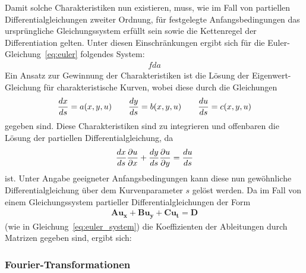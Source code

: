 Damit solche Charakteristiken nun existieren, muss, wie im Fall von partiellen Differentialgleichungen zweiter Ordnung, für festgelegte Anfangsbedingungen das ursprüngliche Gleichungssystem erfüllt sein sowie die Kettenregel der Differentiation gelten. Unter diesen Einschränkungen ergibt sich für die Euler-Gleichung~\eqref{eq:euler} folgendes System:
\begin{align*}
    fda
\end{align*}
Ein Ansatz zur Gewinnung der Charakteristiken ist die Lösung der Eigenwert-Gleichung für charakteristische Kurven, wobei diese durch die Gleichungen
\begin{align}
    \frac{d x}{d s} = a(x,y,u) \qquad \frac{d y}{d s}=b(x,y,u) \qquad \frac{d u}{d s} = c(x,y,u)
\end{align}
gegeben sind. Diese Charakteristiken sind zu integrieren und offenbaren die Lösung der partiellen Differentialgleichung, da
\begin{align*}
    \frac{d x}{d s} \frac{\partial u}{\partial x} + \frac{d y}{d s} \frac{\partial u}{\partial y} = \frac{d u}{d s}
\end{align*}
ist. Unter Angabe geeigneter Anfangsbedingungen kann diese nun gewöhnliche Differentialgleichung über dem Kurvenparameter $s$ gelöst werden. Da im Fall von einem Gleichungssystem partieller Differentialgleichungen der Form
\begin{align*}
    \boldsymbol{Au_x} + \boldsymbol{Bu_y} + \boldsymbol{Cu_t} = \boldsymbol{D}
\end{align*}
(wie in Gleichung~\eqref{eq:euler_system}) die Koeffizienten der Ableitungen durch Matrizen gegeben sind, ergibt sich:



\subsubsection{Fourier-Transformationen}
